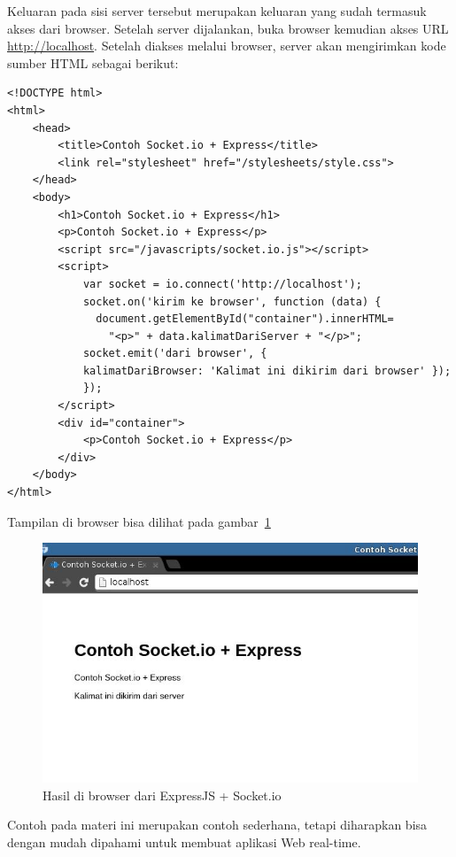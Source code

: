 Keluaran pada sisi server tersebut merupakan keluaran yang sudah termasuk akses dari browser. Setelah server dijalankan, buka browser kemudian akses URL \url{http://localhost}. Setelah diakses melalui browser, server akan mengirimkan kode sumber HTML sebagai berikut:

\lstset{language=html,caption=Kode sumber di browser}
\begin{lstlisting}
<!DOCTYPE html>
<html>
	<head>
		<title>Contoh Socket.io + Express</title>
		<link rel="stylesheet" href="/stylesheets/style.css">
	</head>
	<body>
		<h1>Contoh Socket.io + Express</h1>
		<p>Contoh Socket.io + Express</p>
		<script src="/javascripts/socket.io.js"></script>
		<script>
			var socket = io.connect('http://localhost');
			socket.on('kirim ke browser', function (data) {
			  document.getElementById("container").innerHTML=
			    "<p>" + data.kalimatDariServer + "</p>";
			socket.emit('dari browser', { 
		    kalimatDariBrowser: 'Kalimat ini dikirim dari browser' });
			});
		</script>
		<div id="container">
			<p>Contoh Socket.io + Express</p>
		</div>
	</body>
</html>
\end{lstlisting}

Tampilan di browser bisa dilihat pada gambar~\ref{fig:socket-io-express}

  \begin{figure}
    \begin{center}
      \includegraphics[scale=0.5]{images/socket-io-expressjs.jpg}
    \end{center}
    \caption{Hasil di browser dari ExpressJS + Socket.io}
    \label{fig:socket-io-express}
  \end{figure}

Contoh pada materi ini merupakan contoh sederhana, tetapi diharapkan bisa dengan mudah dipahami untuk membuat aplikasi Web real-time. 
